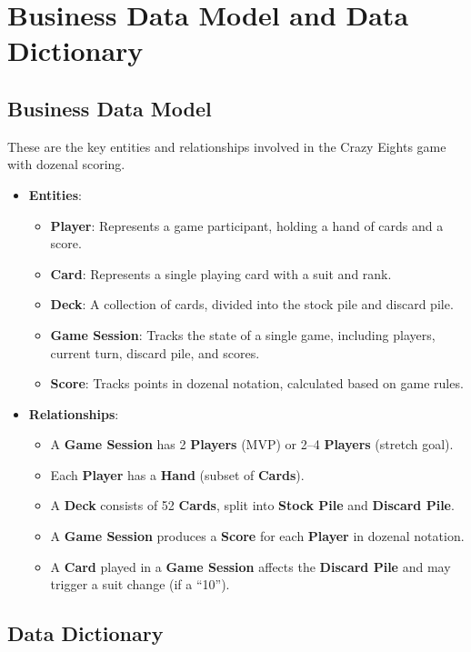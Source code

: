 \documentclass[12pt]{article}
\begin{document}
\section{Business Data Model and Data Dictionary}
\subsection{Business Data Model}

These are the key entities and relationships involved in the Crazy Eights game with dozenal scoring.

\begin{itemize}
    \item \textbf{Entities}:
    \begin{itemize}
        \item \textbf{Player}: Represents a game participant, holding a hand of cards and a score.
        \item \textbf{Card}: Represents a single playing card with a suit and rank.
        \item \textbf{Deck}: A collection of cards, divided into the stock pile and discard pile.
        \item \textbf{Game Session}: Tracks the state of a single game, including players, current turn, discard pile, and scores.
        \item \textbf{Score}: Tracks points in dozenal notation, calculated based on game rules.
    \end{itemize}
    \item \textbf{Relationships}:
    \begin{itemize}
        \item A \textbf{Game Session} has 2 \textbf{Players} (MVP) or 2--4 \textbf{Players} (stretch goal).
        \item Each \textbf{Player} has a \textbf{Hand} (subset of \textbf{Cards}).
        \item A \textbf{Deck} consists of 52 \textbf{Cards}, split into \textbf{Stock Pile} and \textbf{Discard Pile}.
        \item A \textbf{Game Session} produces a \textbf{Score} for each \textbf{Player} in dozenal notation.
        \item A \textbf{Card} played in a \textbf{Game Session} affects the \textbf{Discard Pile} and may trigger a suit change (if a ``10'').
    \end{itemize}
\end{itemize}

\subsection{Data Dictionary}
\end{document}
